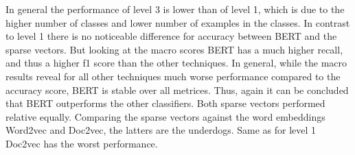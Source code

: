 \documentclass[12pt, a4paper, titlepage]{article}
\begin{document}
\begin{table}[hb!]
\caption{\label{tab: T10} Evaluation of Level 3 classification - macro}
\end{table}

In general the performance of level 3 is lower than of level 1, which is due to the higher number of classes and lower number of examples in the classes. In contrast to level 1 there is no noticeable difference for accuracy between \ac{BERT} and the sparse vectors. But looking at the macro scores \ac{BERT} has a much higher recall, and thus a higher f1 score than the other techniques. In general, while the macro results reveal for all other techniques much worse performance compared to the accuracy score, \ac{BERT} is stable over all metrices. Thus, again it can be concluded that \ac{BERT} outperforms the other classifiers. Both sparse vectors performed relative equally. Comparing the sparse vectors against the word embeddings Word2vec and Doc2vec, the latters are the underdogs. Same as for level 1 Doc2vec has the worst performance. 
\end{document}
